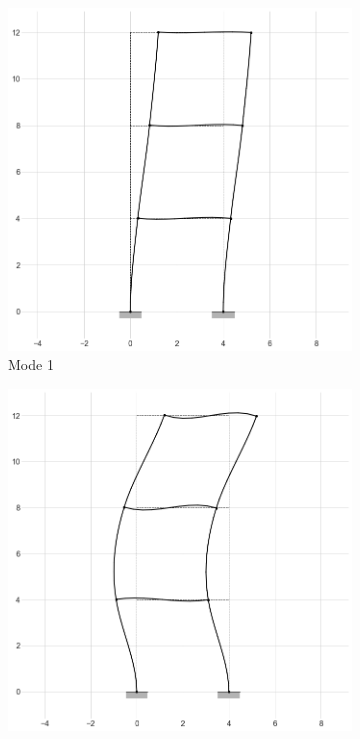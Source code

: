 \begin{figure}[H]
    \centering
    \begin{subfigure}[b]{0.33\textwidth}
        \centering
        \includegraphics[width=\textwidth]{Figures/mode1.png}
        \caption{Mode 1}
        \label{m1}
    \end{subfigure}
    \begin{subfigure}[b]{0.33\textwidth}
        \centering
        \includegraphics[width=\textwidth]{Figures/mode2.png}

\end{subfigure}
\end{figure}
